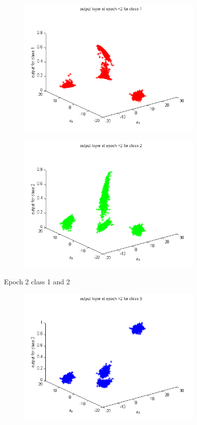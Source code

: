 \documentclass{article}
\begin{document}
\begin{flushleft}
\begin{figure}
\begin{subfigure}{.5\textwidth}
  \centering
  \includegraphics[width=.8\linewidth]{Classification/linearlySeparable/2_1}
 
\end{subfigure}%
\begin{subfigure}{.5\textwidth}
  \centering
  \includegraphics[width=.8\linewidth]{Classification/linearlySeparable/2_2}
  
\end{subfigure}
\caption{Epoch 2 class 1 and 2}
\end{figure}

\begin{figure}
\begin{subfigure}{.5\textwidth}
  \centering
  \includegraphics[width=.8\linewidth]{Classification/linearlySeparable/2_3}
 

\end{subfigure}
\end{figure}
\end{flushleft}
\end{document}
